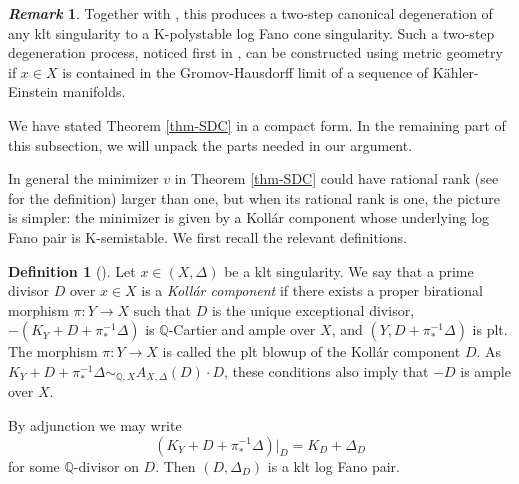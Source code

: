 \documentclass[12pt]{amsart}
\theoremstyle{definition}
\newtheorem{defn}[prop]{Definition}
\newtheorem{rem}[prop]{\it Remark}
\newcommand{\bQ}{\mathbb{Q}}
\numberwithin{equation}{section}
\begin{document}
\begin{rem}
Together with \cite{LWX-tangent-cone}, this produces a two-step canonical degeneration of any klt singularity to a K-polystable log Fano cone singularity. Such a two-step degeneration process, noticed first in \cite{DS-degeneration2}, can be constructed using metric geometry if $x\in X$ is contained in the Gromov-Hausdorff limit of a sequence of K\"ahler-Einstein manifolds.  
\end{rem}

We have stated Theorem \ref{thm-SDC} in a compact form. In the remaining part of this subsection, we will unpack the parts needed in our argument.

In general the minimizer $v$ in Theorem \ref{thm-SDC} could have rational rank (see \cite[2.13 and 2.16]{Xu-book} for the definition) larger than one,  but when its rational rank is one, the picture is simpler: the minimizer is given by a Koll\'ar component whose underlying log Fano pair is K-semistable. We first recall the relevant definitions.

\begin{defn}[\cite{Xu-pi_1-finite}] \label{def:kc}
Let $x\in (X,\Delta)$ be a klt singularity. We say that a prime divisor $D$ over $x\in X$ is a \emph{Koll\'ar component} if there exists a proper birational morphism $\pi\colon Y\to X$ such that $D$ is the unique exceptional divisor, $-(K_Y+D+\pi_*^{-1}\Delta)$ is $\bQ$-Cartier and ample over $X$, and $(Y,D+\pi_*^{-1}\Delta)$ is plt. The morphism $\pi\colon Y\to X$ is called the plt blowup of the Koll\'ar component $D$. As $K_Y+D+\pi_*^{-1}\Delta\sim_{\bQ,X} A_{X,\Delta}(D)\cdot D$, these conditions also imply that $-D$ is ample over $X$.
\end{defn}

By adjunction we may write
\begin{equation} \label{eq:adjunction on kc}
(K_Y + D + \pi_*^{-1}\Delta)|_D = K_D + \Delta_D
\end{equation}
for some $\bQ$-divisor on $D$. Then $(D,\Delta_D)$ is a klt log Fano pair.

\end{document}
